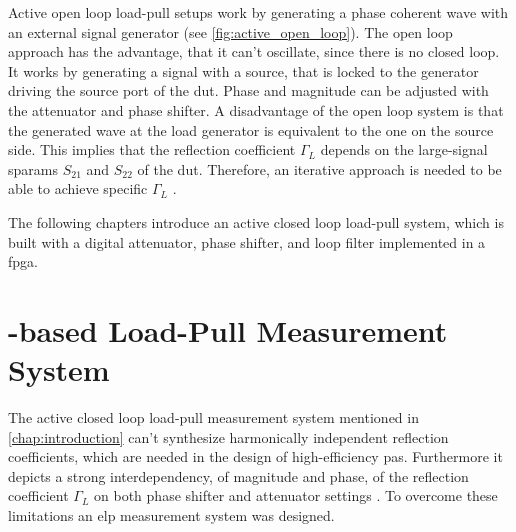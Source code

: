 \documentclass[12pt,a4paper,parskip=full,abstract=true,BCOR=10mm,twoside,open=right]{scrreprt}
\begin{document}
Active open loop load-pull setups work by generating a phase coherent wave with
an external signal generator (see \cref{fig:active_open_loop}). The open loop
approach has the advantage, that it can't oscillate, since there is no closed loop.
It works by generating a signal with a source, that is locked to the generator driving the
source port of the \gls{dut}. Phase and magnitude can be adjusted with the attenuator and
phase shifter. A disadvantage of the open loop system is that the generated wave at
the load generator is equivalent to the one on the source side. This implies that the reflection coefficient
$\Gamma_L$ depends on the large-signal \glspl{sparam} $S_{21}$ and $S_{22}$ of the \gls{dut}.
Therefore, an iterative approach is needed to be able to achieve specific $\Gamma_L$ \cite{muller_comparison_1994}.

The following chapters introduce an active closed loop load-pull system, which
is built with a digital attenuator, phase shifter, and loop filter implemented
in a \gls{fpga}.


\chapter{-based Load-Pull Measurement System}

The active closed loop load-pull measurement system mentioned in
\cref{chap:introduction} can't synthesize harmonically independent
reflection coefficients, which are needed in the design of high-efficiency
\glspl{pa}. Furthermore it depicts a strong interdependency, of magnitude
and phase, of the reflection coefficient $\Gamma_L$ on both phase shifter
and attenuator settings \cite{pozar_mw_engineering_2011}. To overcome these
limitations an \gls{elp} measurement system was designed.
\end{document}
